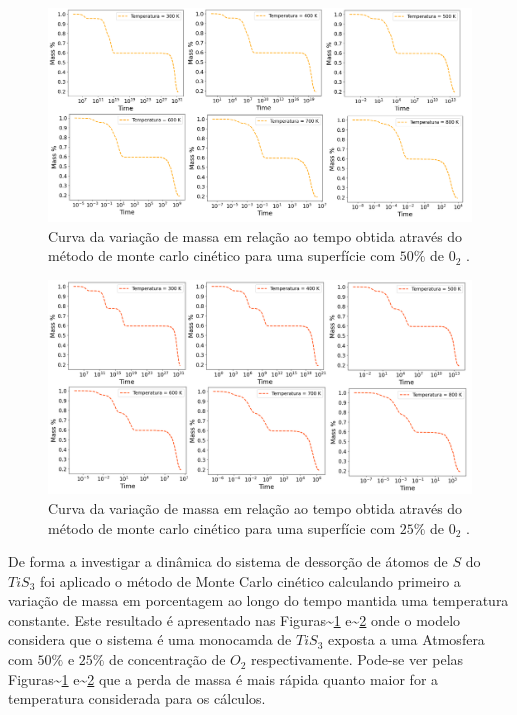 \documentclass[11pt]{article}
\begin{document}
\begin{figure}[!htbp]
\centering\includegraphics[scale=0.8]{figures/var-massa-tempo-2.png}
\caption{Curva da variação de massa em relação ao tempo obtida através do método de monte carlo cinético para uma superfície com $50\%$ de $0_2$ . }
\label{f2}
\end{figure}

\begin{figure}[!htbp]
\centering\includegraphics[scale=0.8]{figures/var-massa-tempo-25.png}
\caption{Curva da variação de massa em relação ao tempo obtida através do método de monte carlo cinético para uma superfície com $25\%$ de $0_2$ . }

\label{f3}
\end{figure}

De forma a investigar a dinâmica do sistema de dessorção de átomos de \(S\) do \(TiS_3\) foi aplicado o método de Monte Carlo cinético calculando primeiro a variação de massa em porcentagem ao longo do tempo mantida uma temperatura constante. Este resultado é apresentado nas Figuras\textasciitilde{}\ref{f2} e\textasciitilde{}\ref{f3} onde o modelo considera que o sistema é uma monocamda de \(TiS_3\) exposta a uma Atmosfera com \(50\%\) e \(25\%\) de concentração de \(O_2\) respectivamente. Pode-se ver pelas Figuras\textasciitilde{}\ref{f2} e\textasciitilde{}\ref{f3} que a perda de massa é mais rápida quanto maior for a temperatura considerada para os cálculos.
\end{document}
